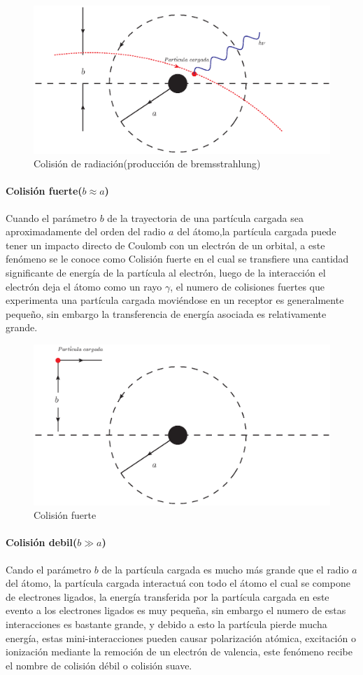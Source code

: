 \begin{figure}[htbp]
   \centering
   \includegraphics[width=.65\linewidth]{./Figures/radiacol.eps}
   \caption[Colisión de radiación]{Colisión de radiación(producción de bremsstrahlung)}
   \label{fig:UoC}
\end{figure}


\paragraph{Colisión fuerte($b\approx a$)}
Cuando el parámetro $b$ de la trayectoria de una partícula cargada sea aproximadamente del orden del radio $a$ del átomo,la partícula cargada puede tener un impacto directo de Coulomb con un electrón de un orbital, a este fenómeno se le conoce como Colisión fuerte en el cual se transfiere una cantidad significante de energía de la partícula al electrón, luego de la interacción el electrón deja el átomo como un rayo $\gamma$, el numero de colisiones fuertes que  experimenta  una partícula cargada moviéndose en un receptor es generalmente pequeño, sin embargo la transferencia de energía asociada es relativamente grande\cite{Podgorsak}.


\begin{figure}[htbp]
   \centering
   \includegraphics[width=.65\linewidth]{./Figures/hardcoli.eps}
   \caption{Colisión fuerte}
   \label{fig:UoC}
\end{figure}

\paragraph{Colisión debil($b\gg a$)}
Cando el parámetro $b$ de la partícula cargada es mucho más grande que el radio $a$ del átomo, la partícula cargada interactuá con todo el átomo el cual se compone de electrones ligados, la energía transferida por la partícula cargada en este evento a los electrones ligados es muy pequeña, sin embargo el numero de estas interacciones es bastante grande, y debido a esto la partícula pierde mucha energía, estas mini-interacciones pueden causar polarización atómica, excitación o ionización mediante la remoción de un electrón de valencia, este fenómeno recibe el nombre de colisión débil o colisión suave\cite{Podgorsak}.

